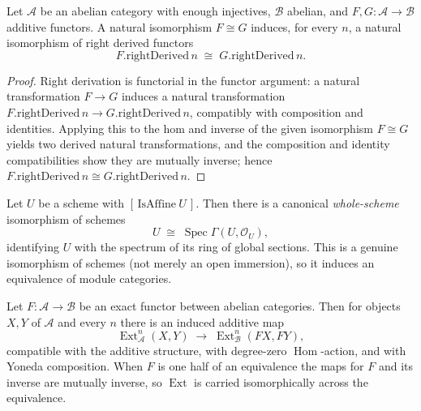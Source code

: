 \begin{lemma}\label{mk-lem:rightDerivedNatIso}
  \leanok

  Let \(\mathcal{A}\) be an abelian category with enough injectives, \(\mathcal{B}\) abelian, and
  \(F, G : \mathcal{A} \to \mathcal{B}\) additive functors. A natural isomorphism \(F \cong G\)
  induces, for every \(n\), a natural isomorphism of right derived functors
  \[
    F.\mathrm{rightDerived}\,n \;\cong\; G.\mathrm{rightDerived}\,n.
  \]
\end{lemma}
\begin{proof}
  \leanok

Right derivation is functorial in the functor argument: a natural transformation \(F \to G\)
  induces a natural transformation \(F.\mathrm{rightDerived}\,n \to G.\mathrm{rightDerived}\,n\),
  compatibly with composition and identities. Applying this to the hom and inverse of the given
  isomorphism \(F \cong G\) yields two derived natural transformations, and the composition and
  identity compatibilities show they are mutually inverse; hence
  \(F.\mathrm{rightDerived}\,n \cong G.\mathrm{rightDerived}\,n\).
\end{proof}

\begin{lemma}
  \label{mk-lem:isoSpec_scheme_mathlib}
  \mathlibok

  Let \(U\) be a scheme with \([\,\mathrm{IsAffine}\ U\,]\). Then there is a canonical
  \emph{whole-scheme} isomorphism of schemes
  \[
    U \;\cong\; \operatorname{Spec}\Gamma(U, \mathcal{O}_U),
  \]
  identifying \(U\) with the spectrum of its ring of global sections. This is a genuine isomorphism of
  schemes (not merely an open immersion), so it induces an equivalence of module categories.
\end{lemma}

\begin{lemma}
  \label{mk-lem:ext_mapExactFunctor_mathlib}
  \mathlibok

  Let \(F : \mathcal{A} \to \mathcal{B}\) be an exact functor between abelian categories. Then for
  objects \(X, Y\) of \(\mathcal{A}\) and every \(n\) there is an induced additive map
  \[
    \operatorname{Ext}^n_{\mathcal{A}}(X, Y) \;\longrightarrow\;
      \operatorname{Ext}^n_{\mathcal{B}}(F X, F Y),
  \]
  compatible with the additive structure, with degree-zero \(\operatorname{Hom}\)-action, and with
  Yoneda composition. When \(F\) is one half of an equivalence the maps for \(F\) and its inverse are
  mutually inverse, so \(\operatorname{Ext}\) is carried isomorphically across the equivalence.
\end{lemma}

